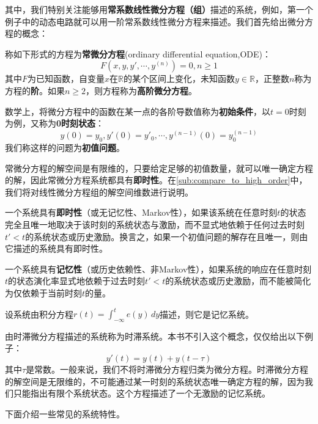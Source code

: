 \documentclass{ctexbook}
\begin{document}
其中，我们特别关注能够用\textbf{常系数线性微分方程（组）}描述的系统，例如，第一个例子中的动态电路就可以用一阶常系数线性微分方程来描述。我们首先给出微分方程的概念：
\begin{definition}[微分方程]
    称如下形式的方程为\textbf{常微分方程}(ordinary differential equation,ODE)\cite{ode}：
    \[F(x,y,y',\cdots,y^{(n)})=0,n\geq 1\]
    其中$F$为已知函数，自变量$x$在$\mathbb{R}$的某个区间上变化，未知函数$y\in\mathbb{R}$，正整数$n$称为方程的\textbf{阶}。如果$n\geq 2$，则方程称为\textbf{高阶微分方程}。
\end{definition}
\begin{definition}[初值问题]
    数学上，将微分方程中的函数在某一点的各阶导数值称为\textbf{初始条件}，以$t=0$时刻为例，又称为\textbf{0时刻状态}：
    \[y(0)=y_0,y'(0)=y'_0,\cdots,y^{(n-1)}(0)=y^{(n-1)}_0\]
    我们称这样的问题为\textbf{初值问题}。
\end{definition}

常微分方程的解空间是有限维的，只要给定足够的初值数量，就可以唯一确定方程的解，因此常微分方程系统都具有\textbf{即时性}。在\ref{sub:compare_to_high_order}中，我们将对线性微分方程组的解空间维数进行说明。

\begin{definition}[即时性与记忆性]
一个系统具有\textbf{即时性}（或无记忆性、Markov性），如果该系统在任意时刻$t$的状态完全且唯一地取决于该时刻的系统状态与激励，而不显式地依赖于任何过去时刻$t'<t$的系统状态或历史激励。换言之，如果一个初值问题的解存在且唯一，则由它描述的系统具有即时性。

一个系统具有\textbf{记忆性}（或历史依赖性、非Markov性），如果系统的响应在任意时刻$t$的状态演化率显式地依赖于过去时刻$t'<t$的系统状态或历史激励，而不能被简化为仅依赖于当前时刻$t$的量。
\end{definition}

\begin{example}[积分方程]
    设系统由积分方程$r(t)=\int_{-\infty}^{t}e(y)\,dy$描述，则它是记忆系统。
\end{example}
\begin{example}[时滞系统]
    由时滞微分方程描述的系统称为时滞系统。本书不引入这个概念，仅仅给出以下例子：
    \[y'(t)=y(t)+y(t-\tau)\]
    其中$\tau$是常数。一般来说，我们不将时滞微分方程归类为微分方程。时滞微分方程的解空间是无限维的，不可能通过某一时刻的系统状态唯一确定方程的解，因为我们只能指出有限个系统状态。这个方程描述了一个无激励的记忆系统。
\end{example}

下面介绍一些常见的系统特性。
\end{document}
